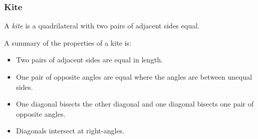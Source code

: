             \subsubsection{ Kite}
            \nopagebreak
          \label{m39354*id319349}A \textsl{kite} is a quadrilateral with two pairs of adjacent sides equal.\par 
          \label{m39354*id319359}A summary of the properties of a kite is:\par 
          \label{m39354*id319362}\begin{itemize}[noitemsep]
            \label{m39354*uid86}\item Two pairs of adjacent sides are equal in length.
\label{m39354*uid87}\item One pair of opposite angles are equal where the angles are between unequal sides.
\label{m39354*uid88}\item One diagonal bisects the other diagonal and one diagonal bisects one pair of opposite angles.
\label{m39354*uid89}\item Diagonals intersect at right-angles.
\end{itemize}
    \setcounter{subfigure}{0}
